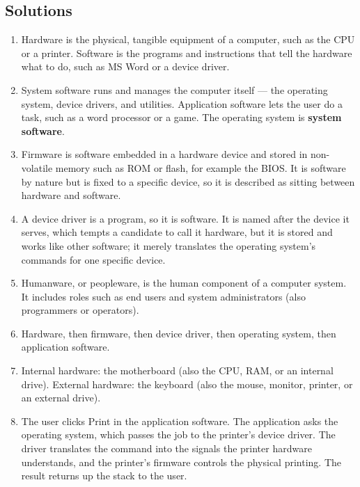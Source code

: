 \documentclass[11pt]{article}
\begin{document}
\subsection*{Solutions}
\begingroup\small
\begin{enumerate}[label=\arabic*.]
  \item Hardware is the physical, tangible equipment of a computer, such as
    the CPU or a printer. Software is the programs and instructions that tell
    the hardware what to do, such as MS Word or a device driver.
  \item System software runs and manages the computer itself --- the operating
    system, device drivers, and utilities. Application software lets the user
    do a task, such as a word processor or a game. The operating system is
    \textbf{system software}.
  \item Firmware is software embedded in a hardware device and stored in
    non-volatile memory such as ROM or flash, for example the BIOS. It is
    software by nature but is fixed to a specific device, so it is described
    as sitting between hardware and software.
  \item A device driver is a program, so it is software. It is named after the
    device it serves, which tempts a candidate to call it hardware, but it is
    stored and works like other software; it merely translates the operating
    system's commands for one specific device.
  \item Humanware, or peopleware, is the human component of a computer system.
    It includes roles such as end users and system administrators (also
    programmers or operators).
  \item Hardware, then firmware, then device driver, then operating system,
    then application software.
  \item Internal hardware: the motherboard (also the CPU, RAM, or an internal
    drive). External hardware: the keyboard (also the mouse, monitor, printer,
    or an external drive).
  \item The user clicks Print in the application software. The application
    asks the operating system, which passes the job to the printer's device
    driver. The driver translates the command into the signals the printer
    hardware understands, and the printer's firmware controls the physical
    printing. The result returns up the stack to the user.
\end{enumerate}
\endgroup
\end{document}
